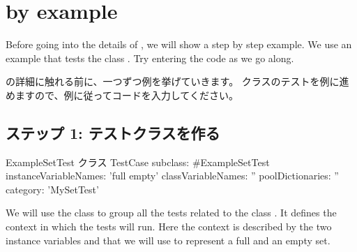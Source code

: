 \documentclass[a4paper,10pt,twoside]{book}
\begin{document}

\section{\sunit by example}

Before going into the details of \SUnit, we will show a step by step
example.  We use an example that tests the class .  Try
entering the code as we go along.
\fi

\SUnit の詳細に触れる前に、一つずつ例を挙げていきます。  クラスのテストを例に進めますので、例に従ってコードを入力してください。

\subsection{ステップ 1: テストクラスを作る}

\fi


\begin{classdef}[exampleSetTest]{ExampleSetTest クラス}
TestCase subclass: #ExampleSetTest
	instanceVariableNames: 'full empty'
	classVariableNames: ''
	poolDictionaries: ''
	category: 'MySetTest'
\end{classdef}

We will use the class  to group all the tests related to
the class .  It defines the context in which the tests
will run.  Here the context is described by
the two instance variables  and 
that we will use to represent a full and an empty set.
\fi
\end{document}
